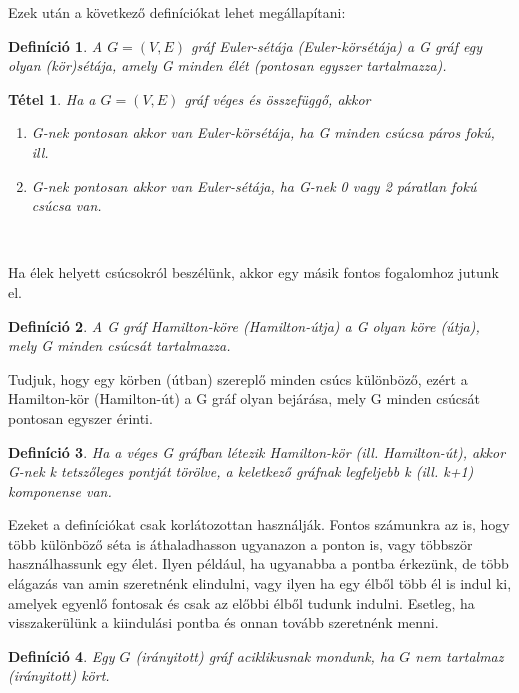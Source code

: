 \documentclass[12pt]{article}
\newtheorem{defin}{Definíció}[section]
\newtheorem{tetel}{Tétel}[section]
\begin{document}
Ezek után a következő definíciókat lehet megállapítani:

\begin{defin}
A $G = (V,E)$ gráf Euler-sétája (Euler-körsétája) a G gráf egy olyan (kör)sétája, amely G minden élét (pontosan egyszer tartalmazza). ~\cite{szam:Fleiner}
\end{defin}

\begin{tetel}
Ha a $G = (V,E)$ gráf véges és összefüggő, akkor 
\begin{enumerate}
\item G-nek pontosan akkor van Euler-körsétája, ha G minden csúcsa páros fokú, ill.
\item G-nek pontosan akkor van Euler-sétája, ha G-nek 0 vagy 2 páratlan fokú csúcsa van.
\end{enumerate} ~\cite{szam:Fleiner}
\end{tetel}

Ha élek helyett csúcsokról beszélünk, akkor egy másik fontos fogalomhoz jutunk el.

\begin{defin}
A G gráf Hamilton-köre (Hamilton-útja) a G olyan köre (útja), mely G minden csúcsát tartalmazza. ~\cite{szam:Fleiner}
\end{defin}

Tudjuk, hogy egy körben (útban) szereplő minden csúcs különböző, ezért a Hamilton-kör (Hamilton-út) a G gráf olyan bejárása, mely G minden csúcsát pontosan egyszer érinti.

\begin{defin}
Ha a véges G gráfban létezik Hamilton-kör (ill. Hamilton-út), akkor G-nek k tetszőleges pontját törölve, a keletkező gráfnak legfeljebb k (ill. k+1) komponense van. ~\cite{szam:Fleiner}
\end{defin}

Ezeket a definíciókat csak korlátozottan használják. Fontos számunkra az is, hogy több különböző séta is áthaladhasson ugyanazon a ponton is, vagy többször használhassunk egy élet.
Ilyen például, ha ugyanabba a pontba érkezünk, de több elágazás van amin szeretnénk elindulni, vagy ilyen ha egy élből több él is indul ki, amelyek egyenlő fontosak és csak az előbbi élből tudunk indulni. Esetleg, ha visszakerülünk a kiindulási pontba és onnan tovább szeretnénk menni.\\

\begin{defin}
Egy $G$ (irányitott) gráf aciklikusnak mondunk, ha $G$ nem tartalmaz (irányitott) kört. ~\cite{szam:Fleiner}
\end{defin}
\end{document}
